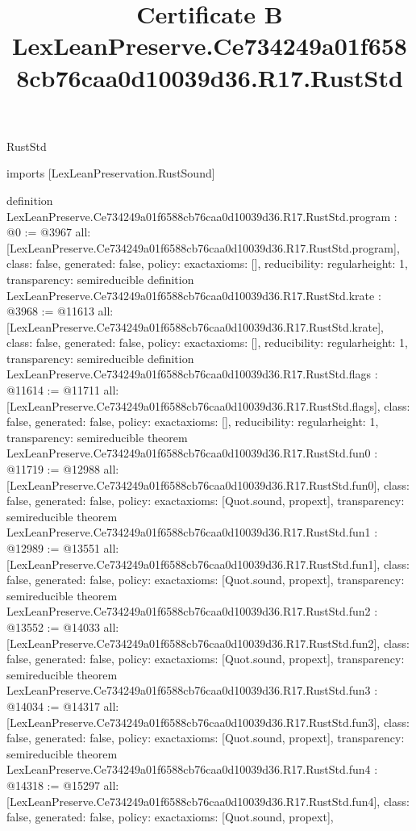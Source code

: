 \begin{lexlean}{RustStd}
\title{Certificate B LexLeanPreserve.Ce734249a01f6588cb76caa0d10039d36.R17.RustStd}
\begin{coremodule}
imports [LexLeanPreservation.RustSound]

definition LexLeanPreserve.Ce734249a01f6588cb76caa0d10039d36.R17.RustStd.program : @0 := @3967 {
  all: [LexLeanPreserve.Ce734249a01f6588cb76caa0d10039d36.R17.RustStd.program],
  class: false,
  generated: false,
  policy: exact{axioms: []},
  reducibility: regular{height: 1},
  transparency: semireducible
}
definition LexLeanPreserve.Ce734249a01f6588cb76caa0d10039d36.R17.RustStd.krate : @3968 := @11613 {
  all: [LexLeanPreserve.Ce734249a01f6588cb76caa0d10039d36.R17.RustStd.krate],
  class: false,
  generated: false,
  policy: exact{axioms: []},
  reducibility: regular{height: 1},
  transparency: semireducible
}
definition LexLeanPreserve.Ce734249a01f6588cb76caa0d10039d36.R17.RustStd.flags : @11614 := @11711 {
  all: [LexLeanPreserve.Ce734249a01f6588cb76caa0d10039d36.R17.RustStd.flags],
  class: false,
  generated: false,
  policy: exact{axioms: []},
  reducibility: regular{height: 1},
  transparency: semireducible
}
theorem LexLeanPreserve.Ce734249a01f6588cb76caa0d10039d36.R17.RustStd.fun0 : @11719 := @12988 {
  all: [LexLeanPreserve.Ce734249a01f6588cb76caa0d10039d36.R17.RustStd.fun0],
  class: false,
  generated: false,
  policy: exact{axioms: [Quot.sound, propext]},
  transparency: semireducible
}
theorem LexLeanPreserve.Ce734249a01f6588cb76caa0d10039d36.R17.RustStd.fun1 : @12989 := @13551 {
  all: [LexLeanPreserve.Ce734249a01f6588cb76caa0d10039d36.R17.RustStd.fun1],
  class: false,
  generated: false,
  policy: exact{axioms: [Quot.sound, propext]},
  transparency: semireducible
}
theorem LexLeanPreserve.Ce734249a01f6588cb76caa0d10039d36.R17.RustStd.fun2 : @13552 := @14033 {
  all: [LexLeanPreserve.Ce734249a01f6588cb76caa0d10039d36.R17.RustStd.fun2],
  class: false,
  generated: false,
  policy: exact{axioms: [Quot.sound, propext]},
  transparency: semireducible
}
theorem LexLeanPreserve.Ce734249a01f6588cb76caa0d10039d36.R17.RustStd.fun3 : @14034 := @14317 {
  all: [LexLeanPreserve.Ce734249a01f6588cb76caa0d10039d36.R17.RustStd.fun3],
  class: false,
  generated: false,
  policy: exact{axioms: [Quot.sound, propext]},
  transparency: semireducible
}
theorem LexLeanPreserve.Ce734249a01f6588cb76caa0d10039d36.R17.RustStd.fun4 : @14318 := @15297 {
  all: [LexLeanPreserve.Ce734249a01f6588cb76caa0d10039d36.R17.RustStd.fun4],
  class: false,
  generated: false,
  policy: exact{axioms: [Quot.sound, propext]},
}
\end{coremodule}
\end{lexlean}
